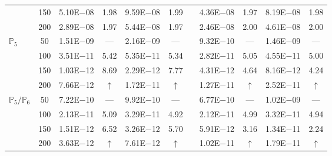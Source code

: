 \begin{table}[H]
{\begin{tabular}{@{}l c c c c c c c c c c@{}}
 & 150 & 5.10E$-$08 & 1.98  & 9.59E$-$08 & 1.99 &  & 4.36E$-$08 & 1.97 & 8.19E$-$08 & 1.98\\
 & 200 & 2.89E$-$08 & 1.97  & 5.44E$-$08 & 1.97 &  & 2.46E$-$08 & 2.00 & 4.61E$-$08 & 2.00\\
\midrule
\multirow{4}{*}{$\mathbb{P}_{5}$}
 & 50 & 1.51E$-$09 & ---  & 2.16E$-$09 & --- &  & 9.32E$-$10 & --- & 1.46E$-$09 & ---\\
 & 100 & 3.51E$-$11 & 5.42  & 5.35E$-$11 & 5.34 &  & 2.82E$-$11 & 5.05 & 4.55E$-$11 & 5.00\\
 & 150 & 1.03E$-$12 & 8.69  & 2.29E$-$12 & 7.77 &  & 4.31E$-$12 & 4.64 & 8.16E$-$12 & 4.24\\
 & 200 & 7.66E$-$12 & $\uparrow$  & 1.72E$-$11 & $\uparrow$ &  & 1.27E$-$11 & $\uparrow$ & 2.52E$-$11 & $\uparrow$\\
\midrule
\multirow{4}{*}{$\mathbb{P}_{5}/\mathbb{P}_{6}$}
 & 50 & 7.22E$-$10 & ---  & 9.92E$-$10 & --- &  & 6.77E$-$10 & --- & 1.02E$-$09 & ---\\
 & 100 & 2.13E$-$11 & 5.09  & 3.29E$-$11 & 4.92 &  & 2.12E$-$11 & 4.99 & 3.32E$-$11 & 4.94\\
 & 150 & 1.51E$-$12 & 6.52  & 3.26E$-$12 & 5.70 &  & 5.91E$-$12 & 3.16 & 1.34E$-$11 & 2.24\\
 & 200 & 3.63E$-$12 & $\uparrow$  & 7.61E$-$12 & $\uparrow$ &  & 1.02E$-$11 & $\uparrow$ & 1.79E$-$11 & $\uparrow$\\
\bottomrule
\end{tabular}}
\label{none}
\end{table}
